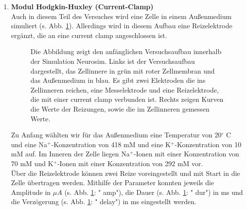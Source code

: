 \documentclass[11pt]{article}
\begin{document}
\begin{enumerate}
\item \textbf{Modul Hodgkin-Huxley (Current-Clamp)}\\
Auch in diesem Teil des Versuches wird eine Zelle in einem Außenmedium simuliert (s. Abb. \ref{a2_aufbau1}). Allerdings wird in diesem Aufbau eine Reizelektrode ergänzt, die an eine current clamp angeschlossen ist. 
\begin{figure}[H]
\caption{Die Abbildung zeigt den anfänglichen Versuchsaufbau innerhalb der Simulation Neurosim. Links ist der Versuchsaufbau dargestellt, das Zellinnere in grün mit roter Zellmembran und das Außenmedium in blau. Es gibt zwei Elektroden die ins Zellinneren reichen, eine Messelektrode und eine Reizelektrode, die mit einer current clamp verbunden ist. Rechts zeigen Kurven die Werte der Reizungen, sowie die im Zellinneren gemessen Werte.}
\label{a2_aufbau1}
\end{figure}
Zu Anfang wählten wir für das Außenmedium eine Temperatur von 20$^\circ$ C und eine Na$^+$-Konzentration von 418 mM und eine K$^+$-Konzentration von 10 mM auf. Im Inneren der Zelle liegen Na$^+$-Ionen mit einer Konzentration von 70 mM und K$^+$-Ionen mit einer Konzentration von 292 mM vor. \\
Über die Reizelektrode können zwei Reize voreingestellt und mit Start in die Zelle übertragen werden. Mithilfe der Parameter konnten jeweils die Amplitude in $\mu A$ (s. Abb. \ref{a2_aufbau1}: "{} amp"{}), die Dauer (s. Abb. \ref{a2_aufbau1}: "{} dur"{}) in ms und die Verzögerung (s. Abb. \ref{a2_aufbau1}: "{} delay"{}) in ms eingestellt werden.\\


\end{enumerate}
\end{document}
